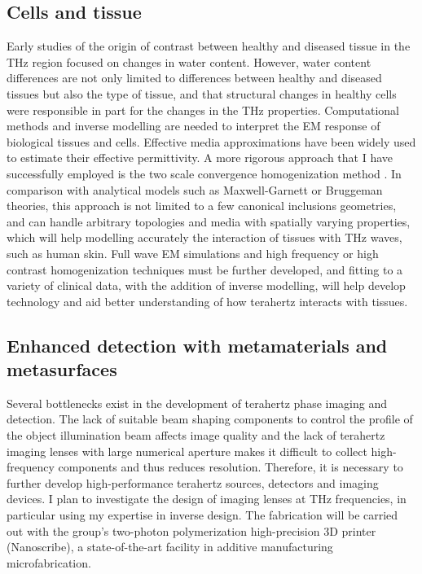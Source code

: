 \documentclass[11pt]{academia}
\begin{document}
\subsection{Cells and tissue}
Early studies of the origin of contrast between healthy and
diseased tissue in the THz region focused on changes in
water content\autocite{yuPotentialTerahertzImaging2012}. 
However, water content differences are not only limited to differences between 
healthy and diseased tissues but also the type of tissue, 
and that structural changes in healthy cells were
responsible in part for the changes in the THz properties\autocite{syTerahertzSpectroscopyLiver2010}.
Computational methods and inverse modelling are needed to interpret the  
EM response of biological tissues and cells. 
Effective media approximations have been widely
used to estimate their effective permittivity. A more rigorous approach 
that I have successfully employed is the two scale convergence homogenization method
\autocite{guenneauHomogenizationThreedimensionalFinite2000}. In comparison
with analytical models such as
Maxwell-Garnett or Bruggeman theories, this approach is not limited to a
few canonical inclusions geometries, and can handle arbitrary topologies
and media with spatially varying properties, which will help modelling accurately 
the interaction of tissues with THz waves, such as 
human skin\autocite{wangTHzSensingHuman2021}. Full wave EM simulations 
and high frequency\autocite{crasterHighfrequencyHomogenizationPeriodic2010}
or high contrast\autocite{cherednichenkoHomogenizationSystemHighcontrast2015} 
homogenization techniques must be further developed, and fitting to a variety of clinical data, 
with the addition of inverse modelling, will help develop technology and 
aid better understanding of how terahertz interacts with tissues. 


\subsection{Enhanced detection with metamaterials and metasurfaces}

Several bottlenecks exist in the development of terahertz phase
imaging and detection. The lack of suitable beam shaping components to control the
profile of the object illumination beam affects image quality and 
the lack of terahertz imaging lenses with large numerical aperture makes it
difficult to collect high-frequency components and thus reduces resolution. 
Therefore, it is necessary to further develop high-performance
terahertz sources, detectors and imaging devices. I plan to investigate the 
design of imaging lenses at THz frequencies, in particular using my 
expertise in inverse design. The fabrication will be carried out with the group's
two-photon polymerization high-precision 3D printer (Nanoscribe), 
a state-of-the-art facility in additive manufacturing microfabrication. 
 
\end{document}
